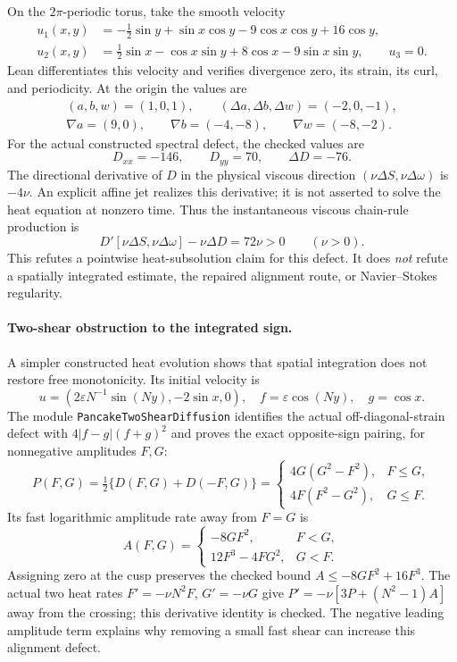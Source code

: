 \documentclass[11pt]{article}
\theoremstyle{definition}
\begin{document}
On the $2\pi$-periodic torus, take the smooth velocity
\begin{align*}
 u_1(x,y)&=-\tfrac12\sin y+\sin x\cos y
                -9\cos x\cos y+16\cos y,\\
 u_2(x,y)&=\tfrac12\sin x-\cos x\sin y
                +8\cos x-9\sin x\sin y,\qquad u_3=0.
\end{align*}
Lean differentiates this velocity and verifies divergence zero, its
strain, its curl, and periodicity. At the origin the values are
\begin{gather*}
 (a,b,w)=(1,0,1),\qquad (\Delta a,\Delta b,\Delta w)=(-2,0,-1),\\
 \nabla a=(9,0),\qquad \nabla b=(-4,-8),\qquad \nabla w=(-8,-2).
\end{gather*}
For the actual constructed spectral defect, the checked values are
\[
 D_{xx}=-146,\qquad D_{yy}=70,\qquad \Delta D=-76.
\]
The directional derivative of $D$ in the physical viscous direction
$(\nu\Delta S,\nu\Delta\omega)$ is $-4\nu$. An explicit affine jet
realizes this derivative; it is not asserted to solve the heat equation
at nonzero time. Thus the instantaneous viscous chain-rule production is
\[
 D'[\nu\Delta S,\nu\Delta\omega]-\nu\Delta D=72\nu>0
 \qquad(\nu>0).
\]
This refutes a pointwise heat-subsolution claim for this defect. It does
\emph{not} refute a spatially integrated estimate, the repaired alignment
route, or Navier--Stokes regularity.

\paragraph{Two-shear obstruction to the integrated sign.}
A simpler constructed heat evolution shows that spatial integration does
not restore free monotonicity. Its initial velocity is
\[
 u=(2\varepsilon N^{-1}\sin(Ny),-2\sin x,0),\quad
 f=\varepsilon\cos(Ny),\quad g=\cos x.
\]
The module \texttt{PancakeTwoShearDiffusion} identifies the actual
off-diagonal-strain defect with $4|f-g|(f+g)^2$ and proves the exact
opposite-sign pairing, for nonnegative amplitudes $F,G$:
\[
 P(F,G)=\tfrac12\{D(F,G)+D(-F,G)\}
 =\begin{cases}
 4G(G^2-F^2),&F\le G,\\
 4F(F^2-G^2),&G\le F.
 \end{cases}
\]
Its fast logarithmic amplitude rate away from $F=G$ is
\[
 A(F,G)=\begin{cases}
 -8GF^2,&F<G,\\
 12F^3-4FG^2,&G<F.
 \end{cases}
\]
Assigning zero at the cusp preserves the checked bound
$A\le-8GF^2+16F^3$. The actual two heat rates
$F'=-\nu N^2F$, $G'=-\nu G$ give
$P'=-\nu[3P+(N^2-1)A]$ away from the crossing; this derivative identity
is checked. The negative leading amplitude term explains why removing a
small fast shear can increase this alignment defect.
\end{document}

